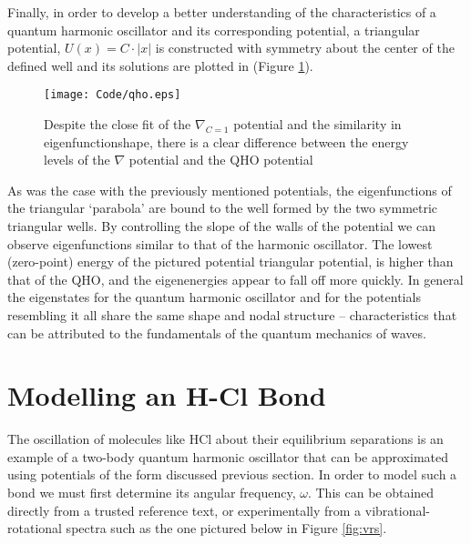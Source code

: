 \documentclass[11pt]{article}
\begin{document}
Finally, in order to develop a better understanding of the characteristics of a quantum harmonic oscillator and its corresponding potential, a triangular potential, $U(x)=C\cdot|x|$ is constructed with symmetry about the center of the defined well and its solutions are plotted in (Figure \ref{fig:QHO}).

\begin{figure}[h]
\begin{center}
\texttt{[image: Code/qho.eps]}
\caption[QHO Plots]{Despite the close fit of the $\nabla_{C=1}$ potential and the similarity in eigenfunction\protect\footnotemark shape, there is a clear difference between the energy levels of the $\nabla$ potential and the QHO potential}
\label{fig:QHO}
\end{center}
\end{figure}
As was the case with the previously mentioned potentials, the eigenfunctions of the triangular ‘parabola’ are bound to the well formed by the two symmetric triangular wells. By controlling the slope of the walls of the potential we can observe eigenfunctions similar to that of the harmonic oscillator. The lowest (zero-point) energy of the pictured potential triangular potential, is higher than that of the QHO, and the eigenenergies appear to fall off more quickly. In general the eigenstates for the quantum harmonic oscillator and for the potentials resembling it all share the same shape and nodal structure – characteristics that can be attributed to the fundamentals of the quantum mechanics of waves.

\newpage

\section{Modelling an H-Cl Bond}
The oscillation of molecules like HCl about their equilibrium separations is an example of a two-body quantum harmonic oscillator that can be approximated using potentials of the form discussed previous section. In order to model such a bond we must first determine its angular frequency, $\omega$. This can be obtained directly from a trusted reference text, or experimentally from a vibrational-rotational spectra such as the one pictured below in Figure \ref{fig:vrs}. 

\newcommand\HCl{\text{HCl}}
\newcommand\Hy{\text{H}}
\newcommand\Cl{\text{Cl}}
\end{document}
